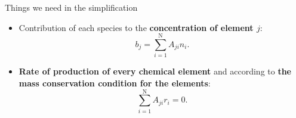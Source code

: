 %
%
\begin{frame}{Things we need in the simplification}
\begin{itemize}

\item Contribution of each species to the \alert{\bf concentration of element $j$}:
\[
b_j = \sum_{i=1}^{\mathrm{N}}A_{ji}n_{i}.
\]
%
\item \alert{\bf Rate of production of every chemical
element} and according to {\bf the mass conservation condition for the elements}:
%
\[
\sum_{i=1}^{\mathrm{N}}A_{ji}r_{i}=0.
\]
\end{itemize}
\end{frame}
%
%
%
%
